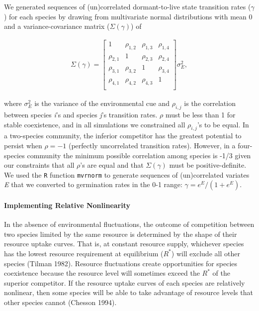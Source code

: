 \documentclass[12pt,]{article}
\let\oldparagraph\paragraph
\renewcommand{\paragraph}[1]{\oldparagraph{#1}\mbox{}}
\begin{document}
We generated sequences of (un)correlated dormant-to-live state
transition rates (\(\gamma\)) for each species by drawing from
multivariate normal distributions with mean 0 and a variance-covariance
matrix (\(\Sigma(\gamma)\)) of \vspace{-3em}

\begin{align}
\Sigma(\gamma) = 
\begin{bmatrix}
1 & \rho_{1,2} & \rho_{1,3} & \rho_{1,4} \\
\rho_{2,1} & 1 & \rho_{2,3} & \rho_{2,4} \\
\rho_{3,1} & \rho_{3,2} & 1  & \rho_{3,4} \\
\rho_{4,1} & \rho_{4,2} & \rho_{4,3} & 1  \\
\end{bmatrix}
\sigma_{E}^2,
\end{align}\vspace{-2em}

\noindent where \(\sigma^2_{E}\) is the variance of the environmental
cue and \(\rho_{i,j}\) is the correlation between species \emph{i}'s and
species \emph{j}'s transition rates. \(\rho\) must be less than 1 for
stable coexistence, and in all simulations we constrained all
\(\rho_{i,j}\)'s to be equal. In a two-species community, the inferior
competitor has the greatest potential to persist when \(\rho=-1\)
(perfectly uncorrelated transition rates). However, in a four-species
community the minimum possible correlation among species is -1/3 given
our constraints that all \(\rho\)'s are equal and that
\(\Sigma(\gamma)\) must be positive-definite. We used the \texttt{R}
function \texttt{mvrnorm} to generate sequences of (un)correlated
variates \emph{E} that we converted to germination rates in the 0-1
range: \(\gamma = e^E / \left(1 + e^E \right)\).

\paragraph{Implementing Relative
Nonlinearity}\label{implementing-relative-nonlinearity}

In the absence of environmental fluctuations, the outcome of competition
between two species limited by the same resource is determined by the
shape of their resource uptake curves. That is, at constant resource
supply, whichever species has the lowest resource requirement at
equilibrium (\(R^*\)) will exclude all other species (Tilman 1982).
Resource fluctuations create opportunities for species coexistence
because the resource level will sometimes exceed the \(R^*\) of the
superior competitor. If the resource uptake curves of each species are
relatively nonlinear, then some species will be able to take advantage
of resource levels that other species cannot (Chesson 1994).
\end{document}
